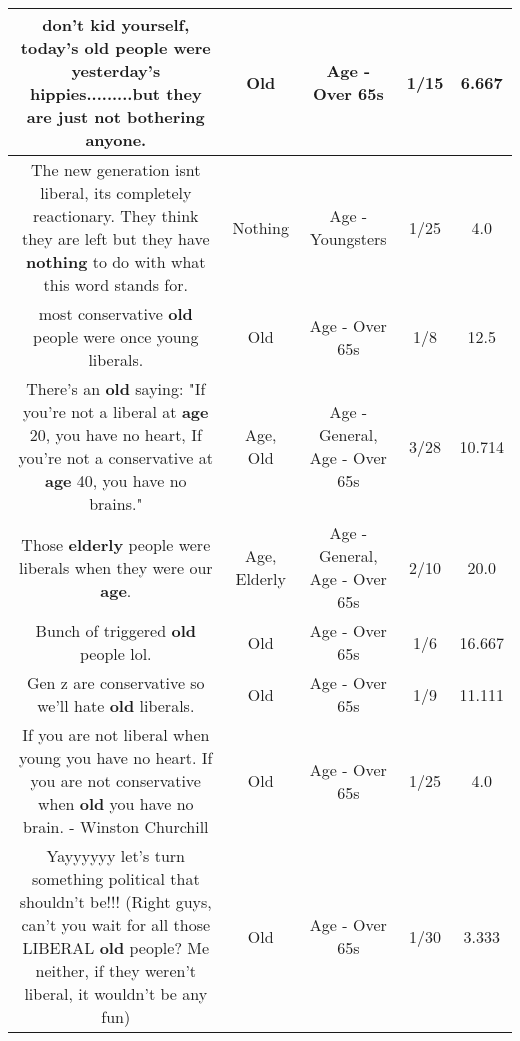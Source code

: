 \documentclass[11pt]{article}
\newlength\mylength
\begin{document}
\begin{center}
\begin{longtable}{|C{.65\mylength}|C{.30\mylength}|C{.12\mylength}|C{.12\mylength}|C{.12\mylength}|}
  \small don't kid yourself, today's \textbf{old} people were yesterday's hippies.........but they are just not bothering anyone.\normalsize   & Old & Age - Over 65s & 1/15 & 6.667 \\  \hline
  \small The new generation isnt liberal, its completely reactionary. They think they are left but they have \textbf{nothing} to do with what this word stands for.\normalsize   & Nothing & Age - Youngsters & 1/25 & 4.0 \\  \hline
  \small most conservative \textbf{old} people were once young liberals.\normalsize   & Old & Age - Over 65s & 1/8 & 12.5 \\  \hline
  \small There's an \textbf{old} saying: "If you're not a liberal at \textbf{age} 20, you have no heart, If you're not a conservative at \textbf{age} 40, you have no brains."\normalsize   & Age, Old & Age - General, Age - Over 65s & 3/28 & 10.714 \\  \hline
  \small Those \textbf{elderly} people were liberals when they were our \textbf{age}.\normalsize   & Age, Elderly & Age - General, Age - Over 65s & 2/10 & 20.0 \\  \hline
  \small Bunch of triggered \textbf{old} people lol.\normalsize   & Old & Age - Over 65s & 1/6 & 16.667 \\  \hline
  \small Gen z are conservative so we'll hate \textbf{old} liberals.\normalsize   & Old & Age - Over 65s & 1/9 & 11.111 \\  \hline
  \small If you are not liberal when young you have no heart. If you are not conservative when \textbf{old} you have no brain. - Winston Churchill\normalsize   & Old & Age - Over 65s & 1/25 & 4.0 \\  \hline
  \small Yayyyyyy let's turn something political that shouldn't be!!! (Right guys, can't you wait for all those LIBERAL \textbf{old} people? Me neither, if they weren't liberal, it wouldn't be any fun)\normalsize   & Old & Age - Over 65s & 1/30 & 3.333 \\  \hline

\end{longtable}
\end{center}
\end{document}

